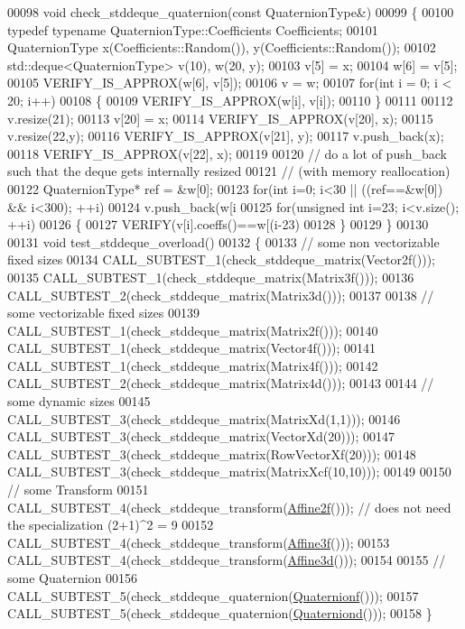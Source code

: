 \begin{DoxyCode}
00098 \textcolor{keywordtype}{void} check\_stddeque\_quaternion(\textcolor{keyword}{const} QuaternionType&)
00099 \{
00100   \textcolor{keyword}{typedef} \textcolor{keyword}{typename} QuaternionType::Coefficients Coefficients;
00101   QuaternionType x(Coefficients::Random()), y(Coefficients::Random());
00102   std::deque<QuaternionType> v(10), w(20, y);
00103   v[5] = x;
00104   w[6] = v[5];
00105   VERIFY\_IS\_APPROX(w[6], v[5]);
00106   v = w;
00107   \textcolor{keywordflow}{for}(\textcolor{keywordtype}{int} i = 0; i < 20; i++)
00108   \{
00109     VERIFY\_IS\_APPROX(w[i], v[i]);
00110   \}
00111 
00112   v.resize(21);
00113   v[20] = x;
00114   VERIFY\_IS\_APPROX(v[20], x);
00115   v.resize(22,y);
00116   VERIFY\_IS\_APPROX(v[21], y);
00117   v.push\_back(x);
00118   VERIFY\_IS\_APPROX(v[22], x);
00119 
00120   \textcolor{comment}{// do a lot of push\_back such that the deque gets internally resized}
00121   \textcolor{comment}{// (with memory reallocation)}
00122   QuaternionType* ref = &w[0];
00123   \textcolor{keywordflow}{for}(\textcolor{keywordtype}{int} i=0; i<30 || ((ref==&w[0]) && i<300); ++i)
00124     v.push\_back(w[i%
00125   \textcolor{keywordflow}{for}(\textcolor{keywordtype}{unsigned} \textcolor{keywordtype}{int} i=23; i<v.size(); ++i)
00126   \{
00127     VERIFY(v[i].coeffs()==w[(i-23)%
00128   \}
00129 \}
00130 
00131 \textcolor{keywordtype}{void} test\_stddeque\_overload()
00132 \{
00133   \textcolor{comment}{// some non vectorizable fixed sizes}
00134   CALL\_SUBTEST\_1(check\_stddeque\_matrix(Vector2f()));
00135   CALL\_SUBTEST\_1(check\_stddeque\_matrix(Matrix3f()));
00136   CALL\_SUBTEST\_2(check\_stddeque\_matrix(Matrix3d()));
00137 
00138   \textcolor{comment}{// some vectorizable fixed sizes}
00139   CALL\_SUBTEST\_1(check\_stddeque\_matrix(Matrix2f()));
00140   CALL\_SUBTEST\_1(check\_stddeque\_matrix(Vector4f()));
00141   CALL\_SUBTEST\_1(check\_stddeque\_matrix(Matrix4f()));
00142   CALL\_SUBTEST\_2(check\_stddeque\_matrix(Matrix4d()));
00143 
00144   \textcolor{comment}{// some dynamic sizes}
00145   CALL\_SUBTEST\_3(check\_stddeque\_matrix(MatrixXd(1,1)));
00146   CALL\_SUBTEST\_3(check\_stddeque\_matrix(VectorXd(20)));
00147   CALL\_SUBTEST\_3(check\_stddeque\_matrix(RowVectorXf(20)));
00148   CALL\_SUBTEST\_3(check\_stddeque\_matrix(MatrixXcf(10,10)));
00149 
00150   \textcolor{comment}{// some Transform}
00151   CALL\_SUBTEST\_4(check\_stddeque\_transform(\hyperlink{group___geometry___module_ga2c1ea05a21899654ee3a2e3f91fa30e0}{Affine2f}())); \textcolor{comment}{// does not need the specialization (2+1)^2
       = 9}
00152   CALL\_SUBTEST\_4(check\_stddeque\_transform(\hyperlink{group___geometry___module_ga17e901de8ff882aea7845c5457db6a4f}{Affine3f}()));
00153   CALL\_SUBTEST\_4(check\_stddeque\_transform(\hyperlink{group___geometry___module_gaaffa69d3143826efeb84e5d6c56a4c78}{Affine3d}()));
00154 
00155   \textcolor{comment}{// some Quaternion}
00156   CALL\_SUBTEST\_5(check\_stddeque\_quaternion(\hyperlink{group___geometry___module_ga785b13a5a87f9bf55d4eba51ead2dcf0}{Quaternionf}()));
00157   CALL\_SUBTEST\_5(check\_stddeque\_quaternion(\hyperlink{group___geometry___module_ga6e77eb8b6aae0e04be2db88107dbc642}{Quaterniond}()));
00158 \}
\end{DoxyCode}
